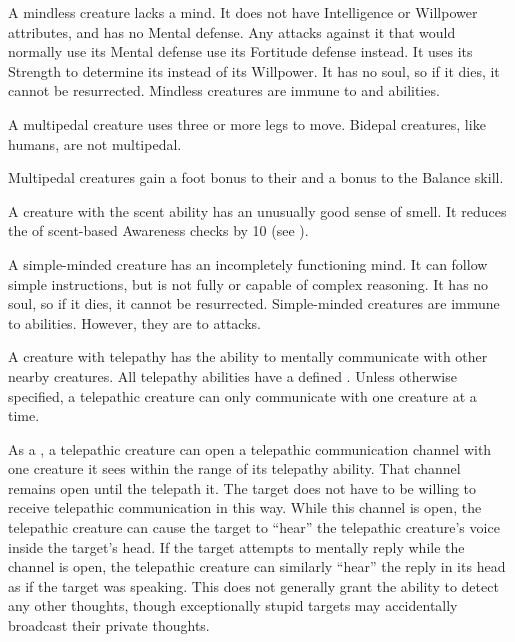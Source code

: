   A mindless creature lacks a mind.
  It does not have Intelligence or Willpower attributes, and has no Mental defense.
  Any attacks against it that would normally use its Mental defense use its Fortitude defense instead.
  It uses its Strength to determine its  instead of its Willpower.
  It has no soul, so if it dies, it cannot be resurrected.
  Mindless creatures are immune to  and  abilities.

  A multipedal creature uses three or more legs to move.
  Bidepal creatures, like humans, are not multipedal.

  Multipedal creatures gain a  foot bonus to their  and a  bonus to the Balance skill.

  A creature with the scent ability has an unusually good sense of smell.
  It reduces the  of scent-based Awareness checks by 10 (see ).

  A simple-minded creature has an incompletely functioning mind.
  It can follow simple instructions, but is not fully  or capable of complex reasoning.
  It has no soul, so if it dies, it cannot be resurrected.
  Simple-minded creatures are immune to  abilities.
  However, they are \vulnerable to  attacks.

  A creature with telepathy has the ability to mentally communicate with other nearby creatures.
  All telepathy abilities have a defined .
  Unless otherwise specified, a telepathic creature can only communicate with one creature at a time.

  As a , a telepathic creature can open a telepathic communication channel with one creature it sees within the range of its telepathy ability.
  That channel remains open until the telepath  it.
  The target does not have to be willing to receive telepathic communication in this way.
  While this channel is open, the telepathic creature can cause the target to ``hear'' the telepathic creature's voice inside the target's head.
  If the target attempts to mentally reply while the channel is open, the telepathic creature can similarly ``hear'' the reply in its head as if the target was speaking.
  This does not generally grant the ability to detect any other thoughts, though exceptionally stupid targets may accidentally broadcast their private thoughts.

